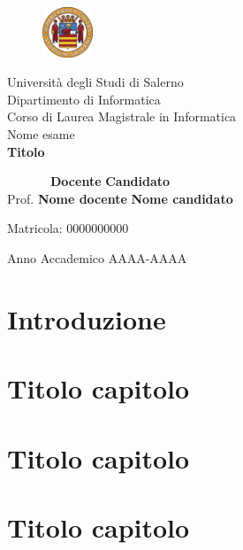 \documentclass[14pt]{extreport}
\begin{document}
\begin{titlepage}
\begin{center}
	\begin{figure}
    	\includegraphics[width=1.5cm, height=1.5cm]{unisa.png}
    	\centering
    \end{figure}
	{\Large Università degli Studi di Salerno}\\[0.2truecm]
	{\large Dipartimento di Informatica\\Corso di Laurea Magistrale in Informatica}\\
	\hrulefill
	\vfill
	{\large Nome esame}\\[0.2truecm]
	\vfill\vfill
	{\LARGE {\bf Titolo}}
	
	\vfill\vfill
	
	
	\ \ \ \ \ \ \ {\bf Docente} \hfill {\bf Candidato}\ \ \\
	Prof. \textbf{ Nome docente} \hfill  \textbf{Nome candidato}
	\centerline{\hfill Matricola: 0000000000}
	
	
	\vfill
	\hrulefill 
	\begin{center} Anno Accademico AAAA-AAAA \end{center}
	
\end{center}
\end{titlepage}

\setcounter{page}{1} 		

\newpage
	

\tableofcontents
\listoffigures %
\listoftables %




\chapter*{Introduzione}
\setcounter{page}{1} 		




\chapter{Titolo capitolo}


\chapter{Titolo capitolo}


\chapter{Titolo capitolo}



\end{document}
